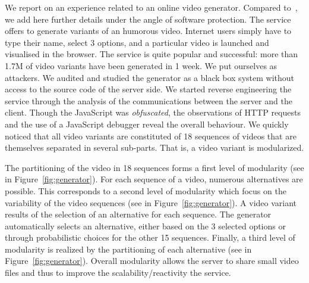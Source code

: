 \documentclass{sig-alternate}
\newcommand{\dcs}[0]{\emph{Description of the case study.}\xspace}
\renewcommand{\dcs}[0]{}
\begin{document}
\dcs
We report on an experience related to an online video generator. 
 Compared to~\cite{BrefVamos14}, we add here further details under the angle of software protection.
 The service offers to generate variants of an humorous video. Internet users simply have to type their name, select 3 options, and a particular video is launched and visualised in the browser. %
The service is quite popular and successful: more than 1.7M of video variants have been generated in 1 week. 
 We put ourselves as attackers. We audited and studied the generator as a black box system without access to the source code of the server side. 
 We started reverse engineering the service through the analysis of the communications between the server and the client. 
Though the JavaScript was \emph{obfuscated}, the observations of HTTP requests and the use of a JavaScript debugger reveal the overall behaviour. We quickly noticed that all video variants are constituted of 18 sequences of videos that are themselves separated in several sub-parts. 
That is, a video variant is modularized. 



The partitioning of the video in 18 sequences forms a first level of modularity (see  in Figure~\ref{fig:generator}). %
For each sequence of a video, numerous alternatives are possible. This corresponds to a second level of modularity which focus on the variability of the video sequences (see  in Figure~\ref{fig:generator}). A video variant results of the selection of an alternative for each sequence. The generator automatically selects an alternative, either based on the 3 selected options or through probabilistic choices for the other 15 sequences. 
 Finally, a third level of modularity is realized by the partitioning of each alternative (see  in Figure~\ref{fig:generator}). Overall modularity allows the server to share small video files and thus to improve the scalability/reactivity the service.
 
\end{document}
